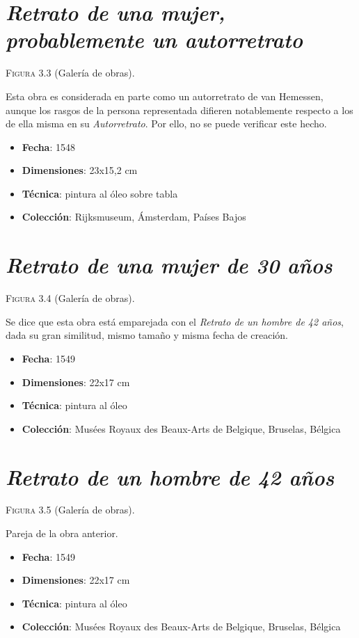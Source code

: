 \documentclass[12pt]{report}
\begin{document}
\section{\textit{Retrato de una mujer, probablemente un autorretrato}}

\textsc{Figura 3.3} (Galería de obras).\bigskip

Esta obra es considerada en parte como un autorretrato de van Hemessen, aunque los rasgos de la persona representada difieren notablemente respecto a los de ella misma en su \textit{Autorretrato}. Por ello, no se puede verificar este hecho.
\begin{itemize}
	\item \textbf{Fecha}: 1548
	\item \textbf{Dimensiones}: 23x15,2 cm
	\item \textbf{Técnica}: pintura al óleo sobre tabla
	\item \textbf{Colección}: Rijksmuseum, Ámsterdam, Países Bajos
\end{itemize}

\section{\textit{Retrato de una mujer de 30 años}}

\textsc{Figura 3.4} (Galería de obras).\bigskip

Se dice que esta obra está emparejada con el \textit{Retrato de un hombre de 42 años}, dada su gran similitud, mismo tamaño y misma fecha de creación.
\begin{itemize}
	\item \textbf{Fecha}: 1549
	\item \textbf{Dimensiones}: 22x17 cm
	\item \textbf{Técnica}: pintura al óleo
	\item \textbf{Colección}: Musées Royaux des Beaux-Arts de Belgique, Bruselas, Bélgica
\end{itemize}

\section{\textit{Retrato de un hombre de 42 años}}

\textsc{Figura 3.5} (Galería de obras).\bigskip

Pareja de la obra anterior.
\begin{itemize}
	\item \textbf{Fecha}: 1549
	\item \textbf{Dimensiones}: 22x17 cm
	\item \textbf{Técnica}: pintura al óleo
	\item \textbf{Colección}: Musées Royaux des Beaux-Arts de Belgique, Bruselas, Bélgica
\end{itemize}
\end{document}
